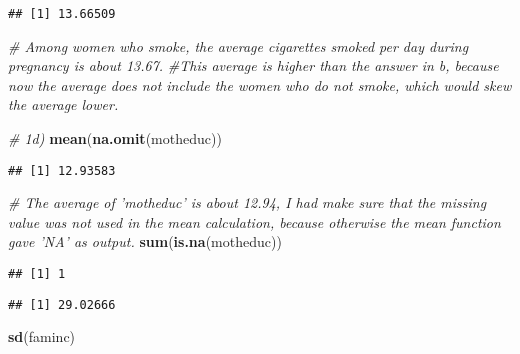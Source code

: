 \documentclass[]{article}
\newenvironment{Shaded}{\begin{snugshade}}{\end{snugshade}}
\newcommand{\CommentTok}[1]{\textcolor[rgb]{0.56,0.35,0.01}{\textit{#1}}}
\newcommand{\KeywordTok}[1]{\textcolor[rgb]{0.13,0.29,0.53}{\textbf{#1}}}
\newcommand{\NormalTok}[1]{#1}
\begin{document}
\begin{verbatim}
## [1] 13.66509
\end{verbatim}

\begin{Shaded}
\begin{Highlighting}[]
\CommentTok{# Among women who smoke, the average cigarettes smoked per day during pregnancy is about 13.67. }
\CommentTok{#This average is higher than the answer in b, because now the average does not include the women who do not smoke, which would skew the average lower. }

\CommentTok{# 1d) }
\KeywordTok{mean}\NormalTok{(}\KeywordTok{na.omit}\NormalTok{(motheduc))}
\end{Highlighting}
\end{Shaded}

\begin{verbatim}
## [1] 12.93583
\end{verbatim}

\begin{Shaded}
\begin{Highlighting}[]
\CommentTok{# The average of 'motheduc' is about 12.94, I had make sure that the missing value was not used in the mean calculation, because otherwise the mean function gave 'NA' as output. }
\KeywordTok{sum}\NormalTok{(}\KeywordTok{is.na}\NormalTok{(motheduc))}
\end{Highlighting}
\end{Shaded}

\begin{verbatim}
## [1] 1
\end{verbatim}

\begin{Shaded}
\end{Shaded}

\begin{verbatim}
## [1] 29.02666
\end{verbatim}

\begin{Shaded}
\begin{Highlighting}[]
\KeywordTok{sd}\NormalTok{(faminc)}
\end{Highlighting}
\end{Shaded}
\end{document}

